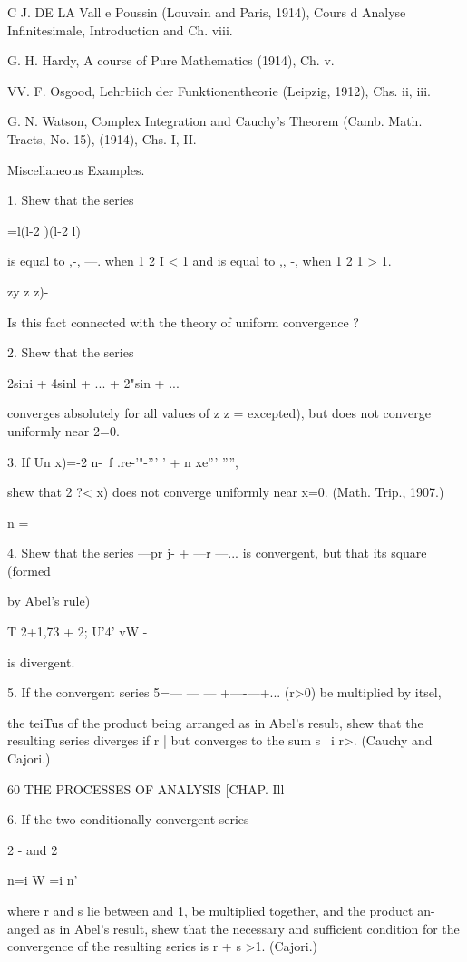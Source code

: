 C J. DE LA Vall e Poussin (Louvain and Paris, 1914), Cours d Analyse
Infinitesimale, Introduction and Ch. viii.

G. H. Hardy, A course of Pure Mathematics (1914), Ch. v.

VV. F. Osgood, Lehrbiich der Funktionentheorie (Leipzig, 1912), Chs.
ii, iii.

G. N. Watson, Complex Integration and Cauchy's Theorem (Camb. Math.
Tracts, No. 15), (1914), Chs. I, II.



Miscellaneous Examples.

1. Shew that the series



 =l(l-2 )(l-2 l)

is equal to ,-, —. when 1 2 I < 1 and is equal to ,, -, when 1 2 1 >
1.

  zy z z)-

Is this fact connected with the theory of uniform convergence ?

2. Shew that the series

2sini + 4sinl + ... + 2"sin + ...

converges absolutely for all values of z z = excepted), but does not
converge uniformly near 2=0.

3. If Un x)=-2 n-\ f .re-'"-''' ' + n xe''' '''',

shew that 2 ?< x) does not converge uniformly near x=0. (Math. Trip.,
1907.)

n = \

4. Shew that the series —pr j- + —r —... is convergent, but that its
square (formed

by Abel's rule)

T 2+1,73 + 2; U'4' vW -

is divergent.

5. If the convergent series 5=— — — +—-—+... (r>0) be multiplied by
itsel,

the teiTus of the product being arranged as in Abel's result, shew
that the resulting series diverges if r | but converges to the sum s \
i r>. (Cauchy and Cajori.)



60 THE PROCESSES OF ANALYSIS [CHAP. Ill

6. If the two conditionally convergent series

2 - and 2



n=i W =i n'

where r and s lie between and 1, be multiplied together, and the
product an-anged as in Abel's result, shew that the necessary and
sufficient condition for the convergence of the resulting series is r
+ s >1. (Cajori.)

